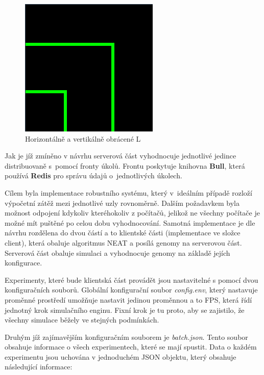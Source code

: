 \begin{figure}[H]
	\centering
	\includegraphics[scale=0.6]{pieces/inverted_upside_L}
	\caption{Horizontálně a vertikálně obrácené L}
	\label{fig:invertedupsidel}
\end{figure}

Jak je jíž zmíněno v návrhu serverová část vyhodnocuje jednotlivé jedince distribuovaně s~pomocí fronty úkolů. Frontu poskytuje knihovna \textbf{Bull}, která používá \textbf{Redis} pro správu údajů o~jednotlivých úkolech. 

Cílem byla implementace robustního systému, který v~ideálním případě rozloží výpočetní zátěž mezi jednotlivé uzly rovnoměrně. Dalším požadavkem byla možnost odpojení kdykoliv kteréhokoliv z počítačů, jelikož ne všechny počítače je možné mít puštěné po celou dobu vyhodnocování.
Samotná implementace je dle návrhu rozdělena do dvou částí a to klientské části (implementace ve složce client), která obaluje algoritmus NEAT a posílá genomy na serverovou část. Serverová část obaluje simulaci a vyhodnocuje genomy na základě jejích konfigurace.

Experimenty, které bude klientská část provádět jsou nastavitelné s pomocí dvou konfiguračních souborů.
Globální konfigurační soubor \emph{config.env}, který nastavuje proměnné prostředí umožňuje nastavit jedinou proměnnou a to FPS, která řídí jednotný krok simulačního enginu. Fixní krok je tu proto, aby se zajistilo, že všechny simulace běžely ve stejných podmínkách.

Druhým jíž zajímavějším konfiguračním souborem je \emph{batch.json}. Tento soubor obsahuje informace o všech experimentech, které se mají spustit. Data o každém experimentu jsou uchována v jednoduchém JSON objektu, který obsahuje následující informace:

